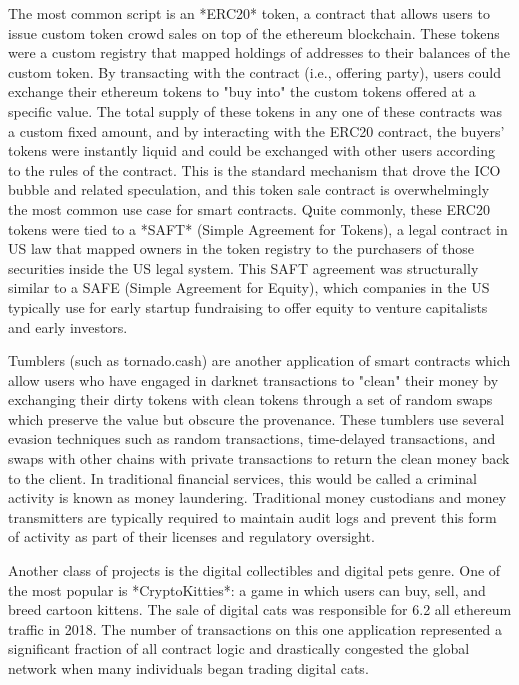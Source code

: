 
The most common script is an *ERC20* token, a contract that allows users to
issue custom token crowd sales on top of the ethereum blockchain. These tokens
were a custom registry that mapped holdings of addresses to their balances of
the custom token. By transacting with the contract (i.e., offering party), users
could exchange their ethereum tokens to "buy into" the custom tokens offered at
a specific value. The total supply of these tokens in any one of these contracts
was a custom fixed amount, and by interacting with the ERC20 contract, the
buyers' tokens were instantly liquid and could be exchanged with other users
according to the rules of the contract. This is the standard mechanism that
drove the ICO bubble and related speculation, and this token sale contract is
overwhelmingly the most common use case for smart contracts. Quite commonly,
these ERC20 tokens were tied to a *SAFT* (Simple Agreement for Tokens), a legal
contract in US law that mapped owners in the token registry to the purchasers of
those securities inside the US legal system. This SAFT agreement was
structurally similar to a SAFE (Simple Agreement for Equity), which companies in
the US typically use for early startup fundraising to offer equity to venture
capitalists and early investors.


Tumblers (such as tornado.cash) are another application of smart contracts which
allow users who have engaged in darknet transactions to "clean" their money by
exchanging their dirty tokens with clean tokens through a set of random swaps
which preserve the value but obscure the provenance. These tumblers use several
evasion techniques such as random transactions, time-delayed transactions, and
swaps with other chains with private transactions to return the clean money back
to the client. In traditional financial services, this would be called a
criminal activity is known as money laundering. Traditional money custodians and
money transmitters are typically required to maintain audit logs and prevent
this form of activity as part of their licenses and regulatory oversight.


Another class of projects is the digital collectibles and digital pets genre.
One of the most popular is *CryptoKitties*: a game in which users can buy, sell,
and breed cartoon kittens. The sale of digital cats was responsible for 6.2%
all ethereum traffic in 2018. The number of transactions on this one application
represented a significant fraction of all contract logic and drastically
congested the global network when many individuals began trading digital cats.

